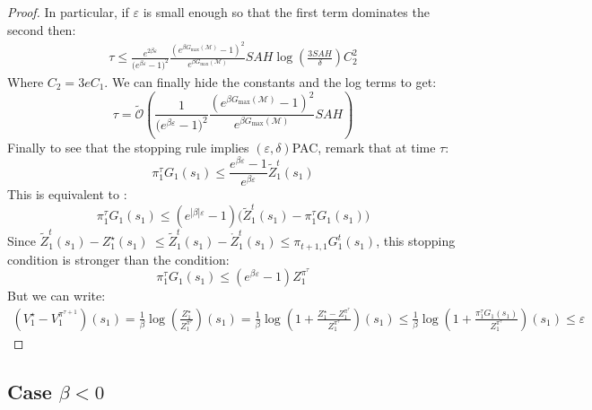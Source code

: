 \documentclass[final,12pt]{colt2026} %
\begin{document}
\begin{proof}
In particular, if $\varepsilon$ is small enough so that the first term dominates the second then:
\begin{align*}
    \tau \leq\frac{e^{2\beta \varepsilon}}{\big(e^{\beta \varepsilon} - 1\big)^2}\frac{(e^{\beta G_{\text{max}}(\mathcal{M})} - 1)^2}{e^{\beta G_{\text{max}}(\mathcal{M})}} SAH \log(\frac{3SAH}{\delta}) C_2^2
\end{align*}
Where $C_2 = 3e C_1$. We can finally hide the constants and the log terms to get:
\[\tau = \tilde{\mathcal{O}}\left( \frac{1}{\big(e^{\beta \varepsilon} - 1\big)^2}\frac{(e^{\beta G_{\text{max}}(\mathcal{M})} - 1)^2}{e^{\beta G_{\text{max}}(\mathcal{M})}} SAH \right)\]
Finally to see that the stopping rule implies $(\varepsilon,\delta)$PAC, remark that at time $\tau$:
$$\pi_1^\tau G_1(s_1) \leq \frac{e^{\beta \varepsilon} - 1}{e^{\beta \varepsilon}} \widetilde{Z}^t_1(s_1) $$
This is equivalent to :
$$\pi_1^\tau G_1(s_1) \leq (e^{|\beta| \varepsilon} - 1) \Bigg(\widetilde{Z}_1^t(s_1) - \pi_{1}^\tau G_1(s_1)\Bigg)$$
Since $
\widetilde{Z}_1^t(s_1)-Z_1^{\star}(s_1)\ \leq \widetilde{Z}_1^t(s_1)-\mathring{Z}_1^{t}(s_1)\leq \pi_{t+1,1}G_1^t(s_1)
$, this stopping condition is stronger than the condition:
$$\pi_1^\tau G_1(s_1) \leq (e^{\beta \varepsilon} - 1) Z_1^{\pi^{\tau}}$$
But we can write:
\begin{align*}
    (V^\star_1 - V^{\pi^{\tau+1}}_1)(s_1) = \frac{1}{\beta} \log\left( \frac{Z^\star_1}{Z_1^{\pi^{\tau}}}\right)(s_1) 
    = \frac{1}{\beta} \log \left(1 + \frac{Z_1^\star - Z_1^{\pi^{\tau}}}{Z_1^{\pi^{\tau}}} \right)(s_1) \leq \frac{1}{\beta} \log\left(1 + \frac{\pi^\tau_1 G_1(s_1)}{Z_1^{\pi^{\tau}}} \right)(s_1) \leq \varepsilon
\end{align*}
\end{proof}
\subsection{Case \texorpdfstring{$\beta <0$}{beta < 0}}\label{beta_negative}
\end{document}
